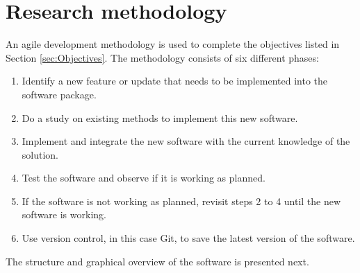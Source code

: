 \section{Research methodology}

An agile development methodology is used to complete the objectives listed in Section \ref{sec:Objectives}. The methodology consists of six different phases:
\begin{enumerate}
\item Identify a new feature or update that needs to be implemented into the software package.
\item Do a study on existing methods to implement this new software.
\item Implement and integrate the new software with the current knowledge of the solution.
\item Test the software and observe if it is working as planned.
\item If the software is not working as planned, revisit steps 2 to 4 until the new software is working.
\item Use version control, in this case Git, to save the latest version of the software.
\end{enumerate}


The structure and graphical overview of the software is presented next.

